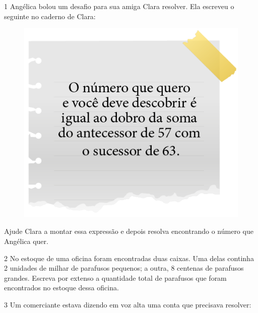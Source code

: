 \pagebreak
{}

\num{1} Angélica bolou um desafio para sua amiga Clara
resolver. Ela escreveu o seguinte no caderno de Clara:

\begin{figure}[htpb!]
\centering
\includegraphics[width=.6\textwidth]{../ilustracoes/MAT5/SAEB_5ANO_MAT_figura90.png}
\end{figure}

Ajude Clara a montar essa expressão e depois resolva encontrando o
número que Angélica quer.

\bigskip
\bigskip
\bigskip
\bigskip
\bigskip
\bigskip

\num{2} No estoque de uma oficina foram encontradas duas caixas.
Uma delas continha 2 unidades de milhar de parafusos pequenos; a outra, 8
centenas de parafusos grandes. Escreva por extenso a quantidade total de
parafusos que foram encontrados no estoque dessa oficina.

\bigskip
\bigskip
\bigskip
\bigskip

\pagebreak
\num{3} Um comerciante estava dizendo em voz alta uma conta que precisava
resolver:

